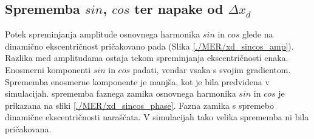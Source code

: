 \subsection{Sprememba $sin$, $cos$ ter napake od $\Delta x_d$}

Potek spreminjanja amplitude osnovnega harmonika $sin$ in $cos$ glede na dinamično ekscentričnost pričakovano pada (Slika \ref{./MER/xd_sincos_amp}). Razlika med amplitudama ostaja tekom spreminjanja ekscentričnosti enaka. Enosmerni komponenti $sin$ in $cos$ padati, vendar vsaka s svojim gradientom. Sprememba enosmerne komponente je manjša, kot je bila predvidena v simulacijah. sprememba faznega zamika osnovnega harmonika $sin$ in $cos$ je prikazana na sliki \ref{./MER/xd_sincos_phase}. Fazna zamika s spremebo dinamične ekscentričnosti naraščata. V simulacijah tako velika sprememba ni bila pričakovana.

